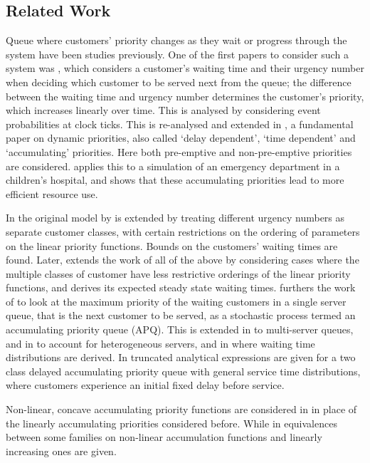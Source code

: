 \documentclass{article}
\begin{document}
\subsection{Related Work}\label{sec:related}
Queue where customers' priority changes as they wait or progress through the
system have been studies previously. One of the first papers to consider such a
system was \cite{jackson60}, which considers a customer's waiting time and their
urgency number when deciding which customer to be served next from the queue;
the difference between the waiting time and urgency number determines the
customer's priority, which increases linearly over time. This is analysed by
considering event probabilities at clock ticks. This is re-analysed and extended
in \cite{kleinrock164}, a fundamental paper on dynamic priorities, also called
`delay dependent', `time dependent' and `accumulating' priorities. Here both
pre-emptive and non-pre-emptive priorities are considered. \cite{ferrandetal18}
applies this to a simulation of an emergency department in a children's
hospital, and shows that these accumulating priorities lead to more efficient
resource use.

In \cite{holtzman71} the original model by \cite{jackson60} is extended by
treating different urgency numbers as separate customer classes, with certain
restrictions on the ordering of parameters on the linear priority functions.
Bounds on the customers' waiting times are found. Later, \cite{bagchisullivan85}
extends the work of all of the above by considering cases where the multiple
classes of customer have less restrictive orderings of the linear priority
functions, and \cite{sharma94} derives its expected steady state waiting times.
\cite{stanford14} furthers the work of \cite{kleinrock164} to look at
the maximum priority of the waiting customers in a single server queue, that is
the next customer to be served, as a stochastic process termed an accumulating
priority queue (APQ). This is extended in \cite{sharif14} to multi-server
queues, and in \cite{li2016} to account for heterogeneous servers, and in
\cite{kella17} where waiting time distributions are derived. In
\cite{bilodeau22} truncated analytical expressions are given for a two class
delayed accumulating priority queue with general service time distributions,
where customers experience an initial fixed delay before service.

Non-linear, concave accumulating priority functions are considered in
\cite{netterman79} in place of the linearly accumulating priorities considered
before. While in \cite{li2017} equivalences between some families on non-linear
accumulation functions and linearly increasing ones are given.
\end{document}

